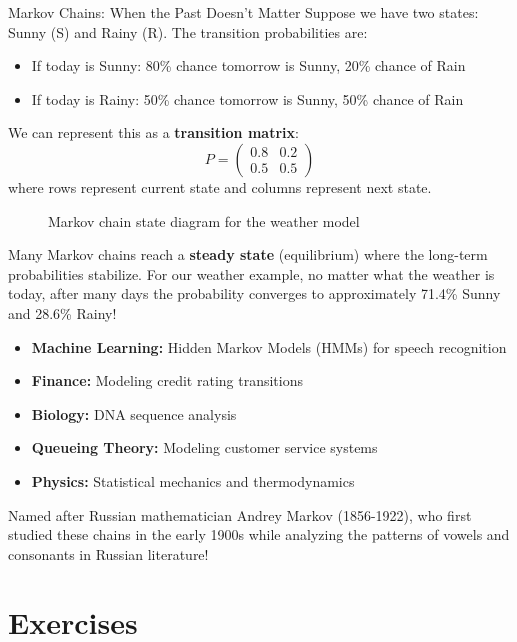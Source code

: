 \begin{funfactsbreak}{Markov Chains: When the Past Doesn't Matter}
Suppose we have two states: Sunny (S) and Rainy (R). The transition probabilities are:
\begin{itemize}
    \item If today is Sunny: 80\% chance tomorrow is Sunny, 20\% chance of Rain
    \item If today is Rainy: 50\% chance tomorrow is Sunny, 50\% chance of Rain
\end{itemize}

We can represent this as a \textbf{transition matrix}:
\[
P = \begin{pmatrix}
0.8 & 0.2 \\
0.5 & 0.5
\end{pmatrix}
\]
where rows represent current state and columns represent next state.

\begin{figure}[H]
    \centering
    \caption{Markov chain state diagram for the weather model}
    \label{fig:markov_weather}
\end{figure}


Many Markov chains reach a \textbf{steady state} (equilibrium) where the long-term probabilities stabilize. For our weather example, no matter what the weather is today, after many days the probability converges to approximately 71.4\% Sunny and 28.6\% Rainy!


\begin{itemize}
    \item \textbf{Machine Learning:} Hidden Markov Models (HMMs) for speech recognition
    \item \textbf{Finance:} Modeling credit rating transitions
    \item \textbf{Biology:} DNA sequence analysis
    \item \textbf{Queueing Theory:} Modeling customer service systems
    \item \textbf{Physics:} Statistical mechanics and thermodynamics
\end{itemize}

Named after Russian mathematician Andrey Markov (1856-1922), who first studied these chains in the early 1900s while analyzing the patterns of vowels and consonants in Russian literature!

\end{funfactsbreak}

\section{Exercises}

